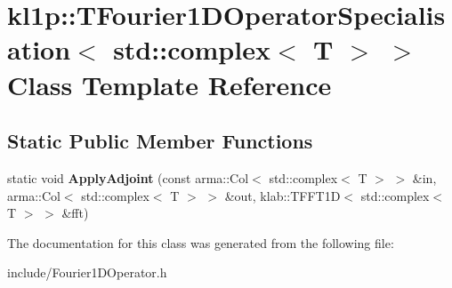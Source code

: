 \hypertarget{classkl1p_1_1TFourier1DOperatorSpecialisation_3_01std_1_1complex_3_01T_01_4_01_4}{}\section{kl1p\+:\+:T\+Fourier1\+D\+Operator\+Specialisation$<$ std\+:\+:complex$<$ T $>$ $>$ Class Template Reference}
\label{classkl1p_1_1TFourier1DOperatorSpecialisation_3_01std_1_1complex_3_01T_01_4_01_4}
\subsection*{Static Public Member Functions}
\begin{DoxyCompactItemize}
\item 
static void {\bfseries Apply\+Adjoint} (const arma\+::\+Col$<$ std\+::complex$<$ T $>$ $>$ \&in, arma\+::\+Col$<$ std\+::complex$<$ T $>$ $>$ \&out, klab\+::\+T\+F\+F\+T1D$<$ std\+::complex$<$ T $>$ $>$ \&fft)\hypertarget{classkl1p_1_1TFourier1DOperatorSpecialisation_3_01std_1_1complex_3_01T_01_4_01_4_a75bfac6795d2d94b7842cf5b417f0f48}{}\label{classkl1p_1_1TFourier1DOperatorSpecialisation_3_01std_1_1complex_3_01T_01_4_01_4_a75bfac6795d2d94b7842cf5b417f0f48}

\end{DoxyCompactItemize}


The documentation for this class was generated from the following file\+:\begin{DoxyCompactItemize}
\item 
include/Fourier1\+D\+Operator.\+h\end{DoxyCompactItemize}

